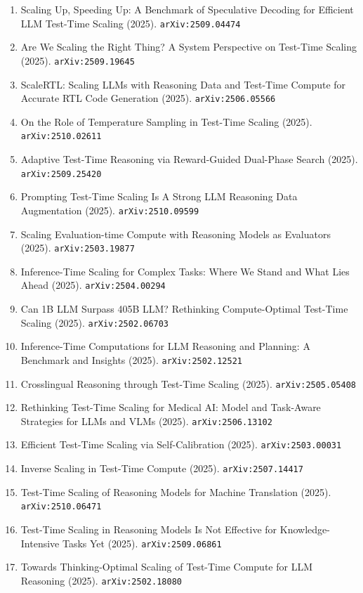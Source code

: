 \documentclass[11pt]{article}
\begin{document}
\begin{enumerate}
  Approach (2025). \texttt{arXiv:2502.05171}
  \item Scaling Up, Speeding Up: A Benchmark of Speculative Decoding for Efficient LLM Test-Time Scaling (2025). \texttt{arXiv:2509.04474}
  \item Are We Scaling the Right Thing? A System Perspective on Test-Time Scaling (2025). \texttt{arXiv:2509.19645}
  \item ScaleRTL: Scaling LLMs with Reasoning Data and Test-Time Compute for Accurate RTL Code Generation (2025). \texttt{arXiv:2506.05566}
  \item On the Role of Temperature Sampling in Test-Time Scaling (2025). \texttt{arXiv:2510.02611}
  \item Adaptive Test-Time Reasoning via Reward-Guided Dual-Phase Search (2025). \texttt{arXiv:2509.25420}
  \item Prompting Test-Time Scaling Is A Strong LLM Reasoning Data Augmentation (2025). \texttt{arXiv:2510.09599}
  \item Scaling Evaluation-time Compute with Reasoning Models as Evaluators (2025). \texttt{arXiv:2503.19877}
  \item Inference-Time Scaling for Complex Tasks: Where We Stand and What Lies
  Ahead (2025). \texttt{arXiv:2504.00294}
  \item Can 1B LLM Surpass 405B LLM? Rethinking Compute-Optimal Test-Time
  Scaling (2025). \texttt{arXiv:2502.06703}
  \item Inference-Time Computations for LLM Reasoning and Planning: A Benchmark
  and Insights (2025). \texttt{arXiv:2502.12521}
  \item Crosslingual Reasoning through Test-Time Scaling (2025). \texttt{arXiv:2505.05408}
  \item Rethinking Test-Time Scaling for Medical AI: Model and Task-Aware Strategies for LLMs and VLMs (2025). \texttt{arXiv:2506.13102}
  \item Efficient Test-Time Scaling via Self-Calibration (2025). \texttt{arXiv:2503.00031}
  \item Inverse Scaling in Test-Time Compute (2025). \texttt{arXiv:2507.14417}
  \item Test-Time Scaling of Reasoning Models for Machine Translation (2025). \texttt{arXiv:2510.06471}
  \item Test-Time Scaling in Reasoning Models Is Not Effective for Knowledge-Intensive Tasks Yet (2025). \texttt{arXiv:2509.06861}
  \item Towards Thinking-Optimal Scaling of Test-Time Compute for LLM Reasoning (2025). \texttt{arXiv:2502.18080}

\end{enumerate}
\end{document}
